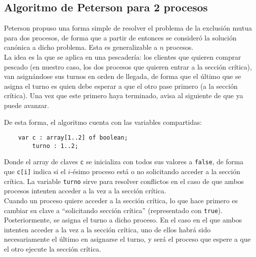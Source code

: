 \subsection{Algoritmo de Peterson para 2 procesos}
Peterson propuso una forma simple de resolver el problema de la exclusión mutua para dos procesos, de forma que a partir de entonces se consideró la solución canónica a dicho problema. Esta es generalizable a $n$ procesos.\\

La idea es la que se aplica en una pescadería: los clientes que quieren comprar pescado (en nuestro caso, los dos procesos que quieren entrar a la sección crítica), van asignándose sus turnos en orden de llegada, de forma que el último que se asigna el turno es quien debe esperar a que el otro pase primero (a la sección crítica). Una vez que este primero haya terminado, avisa al siguiente de que ya puede avanzar.

De esta forma, el algoritmo cuenta con las variables compartidas:
\begin{verbatim}
    var c : array[1..2] of boolean;
        turno : 1..2;
\end{verbatim}
Donde el array de claves \verb|c| se inicializa con todos sus valores a \verb|false|, de forma que \verb|c[i]| indica si el $i$-ésimo proceso está o no solicitando acceder a la sección crítica. La variable \verb|turno| sirve para resolver conflictos en el caso de que ambos procesos intenten acceder a la vez a la sección crítica.\\

Cuando un proceso quiere acceder a la sección crítica, lo que hace primero es cambiar su clave a ``solicitando sección crítica'' (representado con \verb|true|). Posteriormente, se asigna el turno a dicho proceso. En el caso en el que ambos intenten acceder a la vez a la sección crítica, uno de ellos habrá sido necesariamente el último en asignarse el turno, y será el proceso que espere a que el otro ejecute la sección crítica.

